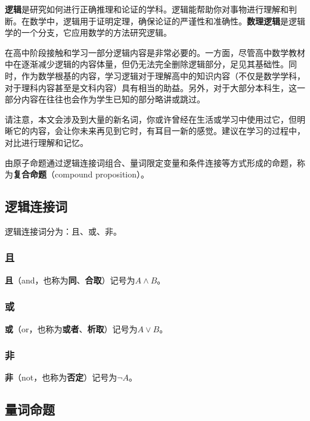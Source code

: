

\textbf{逻辑}是研究如何进行正确推理和论证的学科。逻辑能帮助你对事物进行理解和判断。在数学中，逻辑用于证明定理，确保论证的严谨性和准确性。\textbf{数理逻辑}是逻辑学的一个分支，它应用数学的方法研究逻辑。

在高中阶段接触和学习一部分逻辑内容是非常必要的。一方面，尽管高中数学教材中在逐渐减少逻辑的内容体量，但仍无法完全删除逻辑部分，足见其基础性。同时，作为数学根基的内容，学习逻辑对于理解高中的知识内容（不仅是数学学科，对于理科内容甚至是文科内容）具有相当的助益。另外，对于大部分本科生，这一部分内容在往往也会作为学生已知的部分略讲或跳过。

请注意，本文会涉及到大量的新名词，你或许曾经在生活或学习中使用过它，但明晰它的内容，会让你未来再见到它时，有耳目一新的感觉。建议在学习的过程中，对比进行理解和记忆。


由原子命题通过逻辑连接词组合、量词限定变量和条件连接等方式形成的命题，称为\textbf{复合命题}（compound proposition）。

\subsection{逻辑连接词}

逻辑连接词分为：且、或、非。

\subsubsection{且}

\textbf{且}（and，也称为\textbf{同}、\textbf{合取}）记号为$A\land B$。

\subsubsection{或}

\textbf{或}（or，也称为\textbf{或者}、\textbf{析取}）记号为$A\lor B$。

\subsubsection{非}

\textbf{非}（not，也称为\textbf{否定}）记号为$\lnot A$。

\subsection{量词命题}

